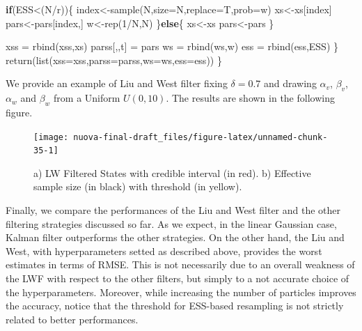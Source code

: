 \documentclass[
]{book}
\newenvironment{Shaded}{\begin{snugshade}}{\end{snugshade}}
\newcommand{\AttributeTok}[1]{\textcolor[rgb]{0.77,0.63,0.00}{#1}}
\newcommand{\ControlFlowTok}[1]{\textcolor[rgb]{0.13,0.29,0.53}{\textbf{#1}}}
\newcommand{\DecValTok}[1]{\textcolor[rgb]{0.00,0.00,0.81}{#1}}
\newcommand{\FunctionTok}[1]{\textcolor[rgb]{0.00,0.00,0.00}{#1}}
\newcommand{\NormalTok}[1]{#1}
\newcommand{\OtherTok}[1]{\textcolor[rgb]{0.56,0.35,0.01}{#1}}
\newcommand{\SpecialCharTok}[1]{\textcolor[rgb]{0.00,0.00,0.00}{#1}}
\theoremstyle{break}
\theoremstyle{nonumberplain}
\begin{document}
\begin{Shaded}
\begin{Highlighting}[]
    \ControlFlowTok{if}\NormalTok{(ESS}\SpecialCharTok{\textless{}}\NormalTok{(N}\SpecialCharTok{/}\NormalTok{r))\{}
\NormalTok{      index}\OtherTok{\textless{}{-}}\FunctionTok{sample}\NormalTok{(N,}\AttributeTok{size=}\NormalTok{N,}\AttributeTok{replace=}\NormalTok{T,}\AttributeTok{prob=}\NormalTok{w)}
\NormalTok{      xs}\OtherTok{\textless{}{-}}\NormalTok{xs[index]}
\NormalTok{      pars}\OtherTok{\textless{}{-}}\NormalTok{pars[index,]}
\NormalTok{      w}\OtherTok{\textless{}{-}}\FunctionTok{rep}\NormalTok{(}\DecValTok{1}\SpecialCharTok{/}\NormalTok{N,N)}
\NormalTok{    \}}\ControlFlowTok{else}\NormalTok{\{}
\NormalTok{      xs}\OtherTok{\textless{}{-}}\NormalTok{xs}
\NormalTok{      pars}\OtherTok{\textless{}{-}}\NormalTok{pars}
\NormalTok{    \}}
    
    
\NormalTok{    xss         }\OtherTok{=} \FunctionTok{rbind}\NormalTok{(xss,xs)}
\NormalTok{    parss[,,t]  }\OtherTok{=}\NormalTok{ pars }
\NormalTok{    ws          }\OtherTok{=} \FunctionTok{rbind}\NormalTok{(ws,w)}
\NormalTok{    ess         }\OtherTok{=} \FunctionTok{rbind}\NormalTok{(ess,ESS)}
\NormalTok{  \}}
  \FunctionTok{return}\NormalTok{(}\FunctionTok{list}\NormalTok{(}\AttributeTok{xss=}\NormalTok{xss,}\AttributeTok{parss=}\NormalTok{parss,}\AttributeTok{ws=}\NormalTok{ws,}\AttributeTok{ess=}\NormalTok{ess))}
\NormalTok{\}}
\end{Highlighting}
\end{Shaded}

We provide an example of Liu and West filter fixing \(\delta=0.7\) and
drawing \(\alpha_{v}\), \(\beta_{v}\), \(\alpha_{w}\) and \(\beta_{w}\)
from a Uniform \(U(0,10)\). The results are shown in the following
figure.

\begin{figure}[H]

{\centering \texttt{[image: nuova-final-draft\_files/figure-latex/unnamed-chunk-35-1]} 

}

\caption{a) LW Filtered States with credible interval (in red). b) Effective sample size (in black) with threshold (in yellow).}\label{fig:unnamed-chunk-35}
\end{figure}

Finally, we compare the performances of the Liu and West filter and the
other filtering strategies discussed so far. As we expect, in the linear
Gaussian case, Kalman filter outperforms the other strategies. On the
other hand, the Liu and West, with hyperparameters setted as described
above, provides the worst estimates in terms of RMSE. This is not
necessarily due to an overall weakness of the LWF with respect to the
other filters, but simply to a not accurate choice of the
hyperparameters. Moreover, while increasing the number of particles
improves the accuracy, notice that the threshold for ESS-based
resampling is not strictly related to better performances.
\end{document}
